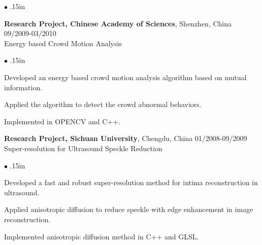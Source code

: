 \documentclass[line,margin]{res}
\newenvironment{bullets}{\begin{list}{\tiny$\bullet$}{\topsep 0pt \itemsep -2pt \leftmargin .15in}}{\vspace*{4pt}\end{list}}
\begin{document}
\begin{resume}
\begin{bullets}
\end{bullets}
\vspace{-.1in}

\textbf{Research Project, Chinese Academy of Sciences}, Shenzhen, China   \hfill      09/2009-03/2010 \\ %
Energy based Crowd Motion Analysis
\begin{bullets}
\item Developed an energy based crowd motion analysis algorithm based on mutual information.
\item Applied the algorithm to detect the crowd abnormal behaviors.
\item Implemented in OPENCV and C++.
\end{bullets}
\vspace{-.1in}

\textbf{Research Project, Sichuan University}, Chengdu, China \hfill      01/2008-09/2009 \\%
Super-resolution for Ultrasound Speckle Reduction
\begin{bullets}
\item Developed a fast and robust super-resolution method for intima reconstruction in
ultrasound. 
\item Applied anisotropic diffusion to reduce speckle with edge enhancement in image reconstruction.
\item Implemented anisotropic diffusion method in C++ and GLSL.
\end{bullets} %


\end{resume}
\end{document}
